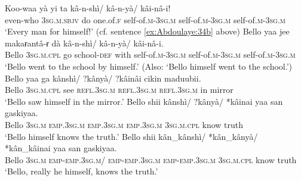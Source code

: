 \documentclass[output=paper]{langscibook}
\begin{document}
\ea%
    \label{ex:Abdoulaye:38}
    \ea  \label{ex:Abdoulaye:38a}
    \gll  Koo-waa  yà  yi  ta  kâ-n-shì/  kâ-n-yà/ kâi-nâ-i!\\
    even-who  \textsc{3sg.m.sbjv}  do  one.of.\textsc{f}  self-of.\textsc{m-3sg.m}  self-of.\textsc{m-3sg.m} self-of.\textsc{m-3sg.m}\\
    \glt `Every man for himself!’ (cf. sentence \ref{ex:Abdoulaye:34b} above)
    \ex  \label{ex:Abdoulaye:38b}
    \gll  Bello  yaa  jee  makaɍantâ-ɍ  dà  kâ-n-shì/  kâ-n-yà/ kâi-nâ-i.\\
    Bello  \textsc{3sg.m.cpl}  go  school-\textsc{def}  with  self-of.\textsc{m-3sg.m}  self-of.\textsc{m-3sg.m} self-of.\textsc{m-3sg.m}\\
    \glt`Bello went to the school by himself.’ (Also: ‘Bello himself went to the school.’)
    \ex  \label{ex:Abdoulaye:38c}
    \gll Bello  yaa  ga  kânshì/  ?kânyà/  ?kâinâi  cikin  maduubii.\\
    Bello  \textsc{3sg.m.cpl}  see  \textsc{refl.3sg.m}  \textsc{refl.3sg.m}  \textsc{refl.3sg.m}  in  mirror\\
    \glt `Bello saw himself in the mirror.’
    \ex  \label{ex:Abdoulaye:38d}
    \gll  Bello  shii  kânshì/  ?kânyà/  *kâinai  yaa  san  gaskiyaa.\\
    Bello  \textsc{3sg.m}  \textsc{emp.3sg.m}  \textsc{emp.3sg.m}  \textsc{emp.3sg.m}  \textsc{3sg.m.cpl}  know  truth\\
    \glt `Bello himself knows the truth.’
    \ex  \label{ex:Abdoulaye:38e}
     \gll Bello  shii  kân\_kânshì/  *kân\_kânyà/  *kân\_kâinai yaa  san  gaskiyaa.\\
    Bello  \textsc{3sg.m} \textsc{emp-emp.3sg.m}/  \textsc{emp-emp.3sg.m}  \textsc{emp-emp.3sg.m} \textsc{3sg.m.cpl}  know  truth\\
    \glt `Bello, really he himself, knows the truth.’
    \z
\z
      
  
\end{document}
